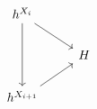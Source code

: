 \documentclass[12pt]{standalone}
\begin{document}
        $$

\begin{tikzcd}
h^{X_i} \ar[dd] \ar[dr] & \\
& H \\
h^{X_{i+1}} \ar[ur] 
\end{tikzcd}
        $$
        
\end{document}
